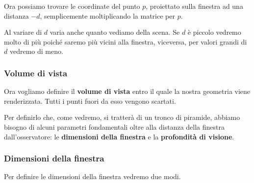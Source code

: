 Ora possiamo trovare le coordinate del punto $p$, proiettato sulla finestra ad una distanza $-d$, semplicemente
moltiplicando la matrice per $p$.

Al variare di $d$ varia anche quanto vediamo della scena. Se $d$ \`e piccolo vedremo molto di pi\`u poich\'e saremo
pi\`u vicini alla finestra, viceversa, per valori grandi di $d$ vedremo di meno.

\subsubsection{Volume di vista}
Ora vogliamo definire il \textbf{volume di vista} entro il quale la nostra geometria viene renderizzata. Tutti i punti
fuori da esso vengono scartati.

Per definirlo  che, come vedremo, si tratter\`a di un tronco di piramide, abbiamo bisogno di alcuni parametri fondamentali
oltre alla distanza della finestra dall'osservatore: le \textbf{dimensioni della finestra} e la
\textbf{profondit\`a di visione}.

\subsubsection{Dimensioni della finestra}
Per definire le dimensioni della finestra vedremo due modi.

